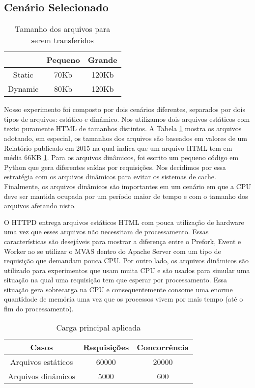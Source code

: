 \subsection{Cenário Selecionado} \label{sec:scenarios}

\begin{table}[!h] \centering \begin{tabular}{|c|c|c|} \hline & \textbf{Pequeno}
& \textbf{Grande}\\ \hline Static & 70Kb & 120Kb\\ \hline Dynamic & 80Kb &
120Kb \\ \hline \end{tabular} \caption{Tamanho dos arquivos para serem
transferidos} \label{tab:file_size} \end{table}

Nosso experimento foi composto por dois cenários diferentes, separados por dois
tipos de arquivos: estático e dinâmico. Nos utilizamos dois arquivos estáticos
com texto puramente HTML de tamanhos distintos. A Tabela \ref{tab:file_size}
mostra os arquivos adotando, em especial, os tamanhos dos arquivos são baseados
em valores de um Relatório publicado em 2015 na qual indica que um arquivo HTML
tem em média 66KB \ref{tab:file_size}. Para os arquivos dinâmicos, foi escrito
um pequeno código em Python que gera diferentes saídas por requisições. Nos
decidimos por essa estratégia com os arquivos dinâmicos para evitar os sistemas
de cache. Finalmente, os arquivos dinâmicos são importantes em um cenário em
que a CPU deve ser mantida ocupada por um período maior de tempo e com o
tamanho dos arquivos afetando nisto.

O HTTPD entrega arquivos estáticos HTML com pouca utilização de hardware uma
vez que esses arquivos não necessitam de processamento. Essas características
são desejáveis para mostrar a diferença entre o Prefork, Event e Worker ao se
utilizar o MVAS dentro do Apache Server com um tipo de requisição que demandam
pouca CPU. Por outro lado, os arquivos dinâmicos são utilizado para
experimentos que usam muita CPU e são usados para simular uma situação na qual
uma requisição tem que esperar por processamento. Essa situação gera sobrecarga
na CPU e consequentemente consome uma enorme quantidade de memória uma vez que
os processos vivem por mais tempo (até o fim do processamento).

\begin{table}[h!] \centering \begin{tabular}{|c|c|c|} \hline Casos &
\textbf{Requisições} & \textbf{Concorrência}\\ \hline Arquivos estáticos &
60000 & 20000\\ \hline Arquivos dinâmicos & 5000 & 600 \\ \hline \end{tabular}
\caption{Carga principal aplicada} \label{tab:loads} \end{table}

